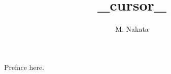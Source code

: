 \documentclass{naughieXetex}
\title{{{_cursor_}}}
\author[*]{M. Nakata}
\affil[*]{Department of Science, Kyoto University}
\date{}
\begin{document}
\begin{prepend}
  Preface here.
\end{prepend}

\attachRefs
\end{document}

